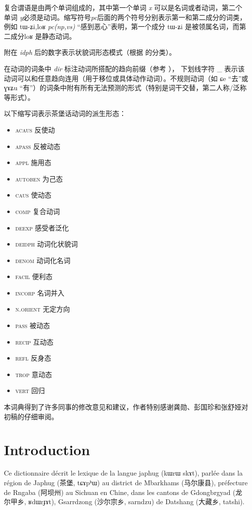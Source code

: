 \documentclass[oldfontcommands,oneside,a4paper,11pt]{article}
\newcommand{\ipa}[1]{{\phon #1}} %
\newcommand{\zh}[1]{{\cn #1}}
\newcommand{\ital}[1]{{\normalfont\textit{#1}}}
\newcommand{\caps}[1]{{\normalfont\textsc{#1}}}
\begin{document}
复合谓语是由两个单词组成的，其中第一个单词 \ital{x} 可以是名词或者动词，第二个单词 \ital{y}必须是动词。缩写符号\ital{pc}后面的两个符号分别表示第一和第二成分的词类，例如 \ipa{tɯ-ʑi,loʁ} \ital{pc(np,vs)} “感到恶心”表明，第一个成分 \ipa{tɯ-ʑi} 是被领属名词，而第二成分\ipa{loʁ} 是静态动词。

附在 \ital{idph} 后的数字表示状貌词形态模式（根据 \citealt{japhug14ideophones}的分类）。

在动词的词条中 \ital{dir} 标注动词所搭配的趋向前缀（参考 \citealt[267-9]{jacques14linking}）， 下划线字符 \_ 表示该动词可以和任意趋向连用（用于移位或具体动作动词）。不规则动词（如 \ipa{ɕe} “去”或  \ipa{ɣɤʑu}  “有”）的词条中附有所有无法预测的形式（特别是词干交替，第二人称/泛称等形式）。

 以下缩写词表示茶堡话动词的派生形态：

\begin{itemize}
\item \caps{acaus} 反使动 
\item \caps{apass} 反被动态
\item \caps{appl} 施用态
\item \caps{autoben} 为己态
\item \caps{caus} 使动态
\item \caps{comp} 复合动词
\item \caps{deexp} 感受者泛化
\item \caps{deidph} 动词化状貌词
\item \caps{denom} 动词化名词
\item \caps{facil} 便利态
\item \caps{incorp} 名词并入
\item \caps{n.orient} 无定方向
\item \caps{pass} 被动态
\item \caps{recip} 互动态
\item \caps{refl} 反身态
\item \caps{trop} 意动态
\item \caps{vert} 回归
\end{itemize}

本词典得到了许多同事的修改意见和建议，作者特别感谢龚勋、彭国珍和张舒娅对初稿的仔细审阅。

\normalfont
\section*{Introduction}

Ce  dictionnaire décrit le lexique de la langue japhug (\ipa{kɯrɯ skɤt}), parlée dans la région de Japhug (\zh{茶堡}, \ipa{tɕɤpʰɯ}) au district de Mbarkhams (\zh{马尔康县}), préfecture de Rngaba (\zh{阿坝州}) au Sichuan en Chine, dans les cantons de Gdongbrgyad (\zh{龙尔甲乡}, \ipa{ʁdɯrɟɤt}), Gsarrdzong (\zh{沙尔宗乡},   \ipa{sarndzu}) de Datshang (\zh{大藏乡}, \ipa{tatshi}).  
\end{document}
